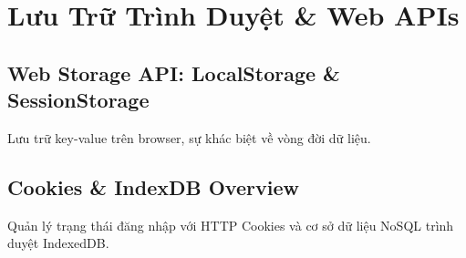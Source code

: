 \chapter{Lưu Trữ Trình Duyệt \& Web APIs}
\label{chap:storage_web_apis}

\section{Web Storage API: LocalStorage \& SessionStorage}
Lưu trữ key-value trên browser, sự khác biệt về vòng đời dữ liệu.

\section{Cookies \& IndexDB Overview}
Quản lý trạng thái đăng nhập với HTTP Cookies và cơ sở dữ liệu NoSQL trình duyệt IndexedDB.
